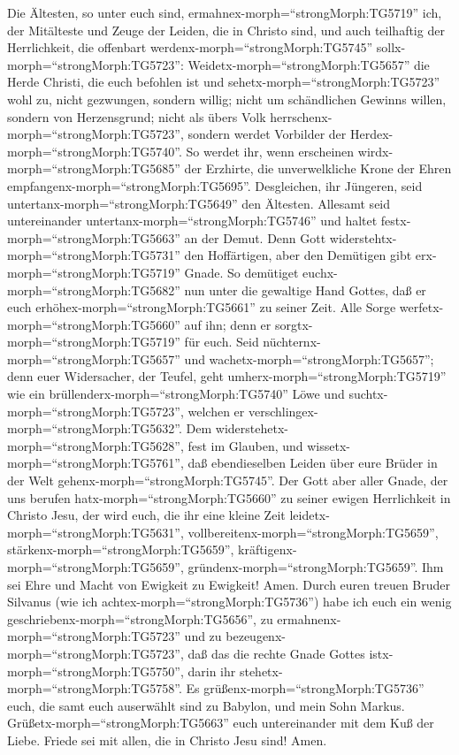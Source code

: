  Die Ältesten, so unter euch sind,
ermahnex-morph=``strongMorph:TG5719'' ich, der Mitälteste und Zeuge der
Leiden, die in Christo sind, und auch teilhaftig der Herrlichkeit, die
offenbart werdenx-morph=``strongMorph:TG5745''
sollx-morph=``strongMorph:TG5723'': 
Weidetx-morph=``strongMorph:TG5657'' die Herde Christi, die euch
befohlen ist und sehetx-morph=``strongMorph:TG5723'' wohl zu, nicht
gezwungen, sondern willig; nicht um schändlichen Gewinns willen, sondern
von Herzensgrund;  nicht als übers Volk
herrschenx-morph=``strongMorph:TG5723'', sondern werdet Vorbilder der
Herdex-morph=``strongMorph:TG5740''.  So werdet ihr, wenn
erscheinen wirdx-morph=``strongMorph:TG5685'' der Erzhirte, die
unverwelkliche Krone der Ehren empfangenx-morph=``strongMorph:TG5695''.
 Desgleichen, ihr Jüngeren, seid
untertanx-morph=``strongMorph:TG5649'' den Ältesten. Allesamt seid
untereinander untertanx-morph=``strongMorph:TG5746'' und haltet
festx-morph=``strongMorph:TG5663'' an der Demut. Denn Gott
widerstehtx-morph=``strongMorph:TG5731'' den Hoffärtigen, aber den
Demütigen gibt erx-morph=``strongMorph:TG5719'' Gnade.  So
demütiget euchx-morph=``strongMorph:TG5682'' nun unter die gewaltige
Hand Gottes, daß er euch erhöhex-morph=``strongMorph:TG5661'' zu seiner
Zeit.  Alle Sorge werfetx-morph=``strongMorph:TG5660'' auf
ihn; denn er sorgtx-morph=``strongMorph:TG5719'' für euch. 
Seid nüchternx-morph=``strongMorph:TG5657'' und
wachetx-morph=``strongMorph:TG5657''; denn euer Widersacher, der Teufel,
geht umherx-morph=``strongMorph:TG5719'' wie ein
brüllenderx-morph=``strongMorph:TG5740'' Löwe und
suchtx-morph=``strongMorph:TG5723'', welchen er
verschlingex-morph=``strongMorph:TG5632''.  Dem
widerstehetx-morph=``strongMorph:TG5628'', fest im Glauben, und
wissetx-morph=``strongMorph:TG5761'', daß ebendieselben Leiden über eure
Brüder in der Welt gehenx-morph=``strongMorph:TG5745''. 
Der Gott aber aller Gnade, der uns berufen
hatx-morph=``strongMorph:TG5660'' zu seiner ewigen Herrlichkeit in
Christo Jesu, der wird euch, die ihr eine kleine Zeit
leidetx-morph=``strongMorph:TG5631'',
vollbereitenx-morph=``strongMorph:TG5659'',
stärkenx-morph=``strongMorph:TG5659'',
kräftigenx-morph=``strongMorph:TG5659'',
gründenx-morph=``strongMorph:TG5659''.  Ihm sei Ehre und
Macht von Ewigkeit zu Ewigkeit! Amen.  Durch euren treuen
Bruder Silvanus (wie ich achtex-morph=``strongMorph:TG5736'') habe ich
euch ein wenig geschriebenx-morph=``strongMorph:TG5656'', zu
ermahnenx-morph=``strongMorph:TG5723'' und zu
bezeugenx-morph=``strongMorph:TG5723'', daß das die rechte Gnade Gottes
istx-morph=``strongMorph:TG5750'', darin ihr
stehetx-morph=``strongMorph:TG5758''.  Es
grüßenx-morph=``strongMorph:TG5736'' euch, die samt euch auserwählt sind
zu Babylon, und mein Sohn Markus. 
Grüßetx-morph=``strongMorph:TG5663'' euch untereinander mit dem Kuß der
Liebe. Friede sei mit allen, die in Christo Jesu sind! Amen.
